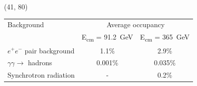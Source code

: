 \documentclass[final,xcolor={dvipsnames,svgnames,x11names,table}]{beamer}
\begin{document}
\begin{frame}
\begin{textblock}{40}
\begin{tcolorbox}[title=Main sources of beam-induced backgrounds]
  \end{tcolorbox}
\end{textblock}

\begin{textblock}{40}(41, 80)
  \begin{tcolorbox}[title=Summary of beam-induced backgrounds]

  \centering
	\begin{tabular}{l c c}
  	\toprule
	   Background & \multicolumn{2}{c}{Average occupancy} \\
	    & E\textsubscript{cm} = 91.2~GeV &  E\textsubscript{cm} = 365~GeV \\
	   \midrule
	   $e^+e^-$ pair background & 1.1\% & 2.9\% \\
	   $\gamma\gamma\rightarrow$ hadrons & 0.001\% & 0.035\%  \\
	   Synchrotron radiation & - & 0.2\% \\
	   \bottomrule
	\end{tabular}

  \end{tcolorbox}
\end{textblock}

\end{frame}
\end{document}
